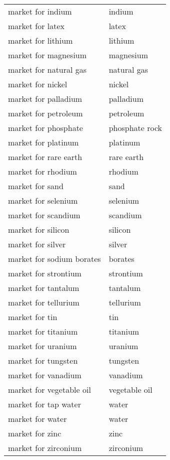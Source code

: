 \documentclass{article}
\begin{document}
\begin{table}[ht]
\begin{tabular}{ll}
market for indium & indium \\
market for latex & latex \\
market for lithium & lithium \\
market for magnesium & magnesium \\
market for natural gas & natural gas \\
market for nickel & nickel \\
market for palladium & palladium \\
market for petroleum & petroleum \\
market for phosphate & phosphate rock \\
market for platinum & platinum \\
market for rare earth & rare earth \\
market for rhodium & rhodium \\
market for sand & sand \\
market for selenium & selenium \\
market for scandium & scandium \\
market for silicon & silicon \\
market for silver & silver \\
market for sodium borates & borates \\
market for strontium & strontium \\
market for tantalum & tantalum \\
market for tellurium & tellurium \\
market for tin & tin \\
market for titanium & titanium \\
market for uranium & uranium \\
market for tungsten & tungsten \\
market for vanadium & vanadium \\
market for vegetable oil & vegetable oil \\
market for tap water & water \\
market for water & water \\
market for zinc & zinc \\
market for zirconium & zirconium \\
\bottomrule
\end{tabular}
\end{table}
\end{document}
